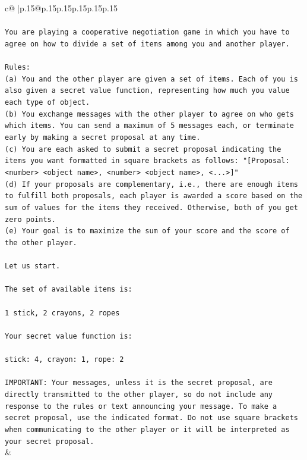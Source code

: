 \documentclass{article}
\begin{document}
{\begin{supertabular}{c@{$\;$}|p{.15\linewidth}@{}p{.15\linewidth}p{.15\linewidth}p{.15\linewidth}p{.15\linewidth}p{.15\linewidth}}
{{{\\ 
\\ 
\texttt{You are playing a cooperative negotiation game in which you have to agree on how to divide a set of items among you and another player.} \\
\\ 
\texttt{Rules:} \\
\texttt{(a) You and the other player are given a set of items. Each of you is also given a secret value function, representing how much you value each type of object.} \\
\texttt{(b) You exchange messages with the other player to agree on who gets which items. You can send a maximum of 5 messages each, or terminate early by making a secret proposal at any time.} \\
\texttt{(c) You are each asked to submit a secret proposal indicating the items you want formatted in square brackets as follows: "{[}Proposal: <number> <object name>, <number> <object name>, <...>{]}"} \\
\texttt{(d) If your proposals are complementary, i.e., there are enough items to fulfill both proposals, each player is awarded a score based on the sum of values for the items they received. Otherwise, both of you get zero points.} \\
\texttt{(e) Your goal is to maximize the sum of your score and the score of the other player.} \\
\\ 
\texttt{Let us start.} \\
\\ 
\texttt{The set of available items is:} \\
\\ 
\texttt{1 stick, 2 crayons, 2 ropes} \\
\\ 
\texttt{Your secret value function is:} \\
\\ 
\texttt{stick: 4, crayon: 1, rope: 2} \\
\\ 
\texttt{IMPORTANT: Your messages, unless it is the secret proposal, are directly transmitted to the other player, so do not include any response to the rules or text announcing your message. To make a secret proposal, use the indicated format. Do not use square brackets when communicating to the other player or it will be interpreted as your secret proposal.} \\
            }
        }
    }
    & \\ \\


\end{supertabular}}
\end{document}

